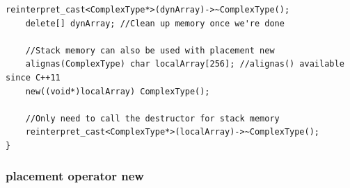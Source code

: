 \documentclass[a4paper,11pt,twoside]{book}
\begin{document}
\begin{itemize}
\begin{lstlisting}[numbers=none]
	reinterpret_cast<ComplexType*>(dynArray)->~ComplexType();
	delete[] dynArray; //Clean up memory once we're done
	
	//Stack memory can also be used with placement new
	alignas(ComplexType) char localArray[256]; //alignas() available since C++11
	new((void*)localArray) ComplexType();
	
	//Only need to call the destructor for stack memory
	reinterpret_cast<ComplexType*>(localArray)->~ComplexType();
}
\end{lstlisting}

\end{itemize}

\subsubsection{placement operator new}
\end{document}
